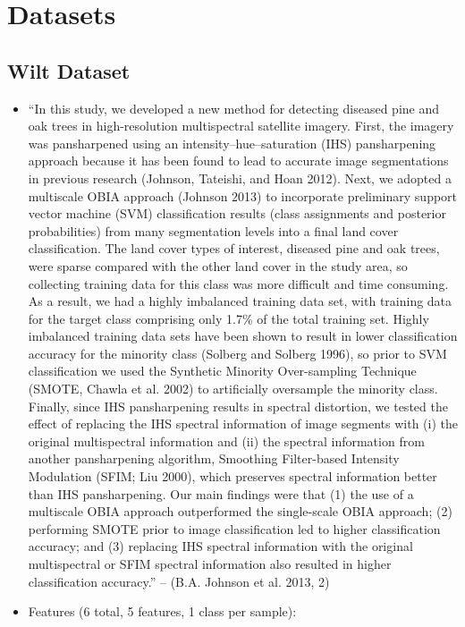 \documentclass[12pt]{article}
\begin{document}
\section{Datasets}
\subsection{Wilt Dataset}
\begin{itemize}
    \item “In this study, we developed a new method for detecting diseased pine and oak trees in high-resolution multispectral satellite imagery. First, the imagery was pansharpened using an intensity–hue–saturation (IHS) pansharpening approach because it has been found to lead to accurate image segmentations in previous research (Johnson, Tateishi, and Hoan 2012). Next, we adopted a multiscale OBIA approach (Johnson 2013) to incorporate preliminary support vector machine (SVM) classification results (class assignments and posterior probabilities) from many segmentation levels into a final land cover classification. The land cover types of interest, diseased pine and oak trees, were sparse compared with the other land cover in the study area, so collecting training data for this class was more difficult and time consuming. As a result, we had a highly imbalanced training data set, with training data for the target class comprising only 1.7\% of the total training set. Highly imbalanced training data sets have been shown to result in lower classification accuracy for the minority class (Solberg and Solberg 1996), so prior to SVM classification we used the Synthetic Minority Over-sampling Technique (SMOTE, Chawla et al. 2002) to artificially oversample the minority class. Finally, since IHS pansharpening results in spectral distortion, we tested the effect of replacing the IHS spectral information of image segments with (i) the original multispectral information and (ii) the spectral information from another pansharpening algorithm, Smoothing Filter-based Intensity Modulation (SFIM; Liu 2000), which preserves spectral information better than IHS pansharpening. Our main findings were that (1) the use of a multiscale OBIA approach outperformed the single-scale OBIA approach; (2) performing SMOTE prior to image classification led to higher classification accuracy; and (3) replacing IHS spectral information with the original multispectral or SFIM spectral information also resulted in higher classification accuracy.” – (B.A. Johnson et al. 2013, 2)
    \item Features (6 total, 5 features, 1 class per sample):

\end{itemize}
\end{document}
